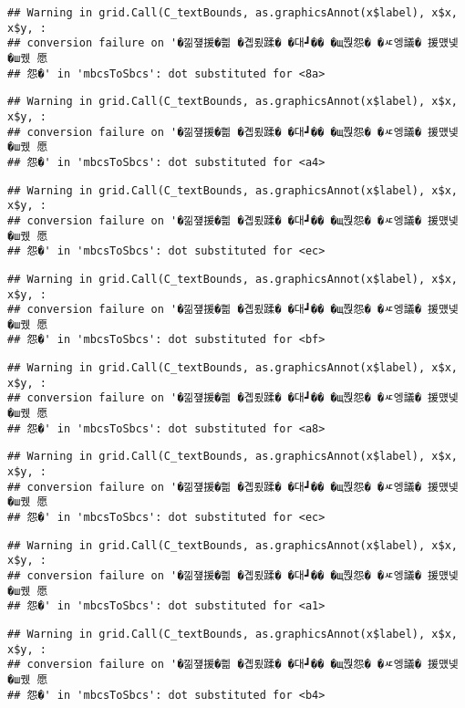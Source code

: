 \documentclass[
]{article}
\begin{document}
\begin{verbatim}
## Warning in grid.Call(C_textBounds, as.graphicsAnnot(x$label), x$x, x$y, :
## conversion failure on '�낆쟾援�쁾 �곕룄蹂� �대┛�� �щ쭩怨� �ㅼ엥議� 援먰넻�ш퀬 愿
## 怨�' in 'mbcsToSbcs': dot substituted for <8a>
\end{verbatim}

\begin{verbatim}
## Warning in grid.Call(C_textBounds, as.graphicsAnnot(x$label), x$x, x$y, :
## conversion failure on '�낆쟾援�쁾 �곕룄蹂� �대┛�� �щ쭩怨� �ㅼ엥議� 援먰넻�ш퀬 愿
## 怨�' in 'mbcsToSbcs': dot substituted for <a4>
\end{verbatim}

\begin{verbatim}
## Warning in grid.Call(C_textBounds, as.graphicsAnnot(x$label), x$x, x$y, :
## conversion failure on '�낆쟾援�쁾 �곕룄蹂� �대┛�� �щ쭩怨� �ㅼ엥議� 援먰넻�ш퀬 愿
## 怨�' in 'mbcsToSbcs': dot substituted for <ec>
\end{verbatim}

\begin{verbatim}
## Warning in grid.Call(C_textBounds, as.graphicsAnnot(x$label), x$x, x$y, :
## conversion failure on '�낆쟾援�쁾 �곕룄蹂� �대┛�� �щ쭩怨� �ㅼ엥議� 援먰넻�ш퀬 愿
## 怨�' in 'mbcsToSbcs': dot substituted for <bf>
\end{verbatim}

\begin{verbatim}
## Warning in grid.Call(C_textBounds, as.graphicsAnnot(x$label), x$x, x$y, :
## conversion failure on '�낆쟾援�쁾 �곕룄蹂� �대┛�� �щ쭩怨� �ㅼ엥議� 援먰넻�ш퀬 愿
## 怨�' in 'mbcsToSbcs': dot substituted for <a8>
\end{verbatim}

\begin{verbatim}
## Warning in grid.Call(C_textBounds, as.graphicsAnnot(x$label), x$x, x$y, :
## conversion failure on '�낆쟾援�쁾 �곕룄蹂� �대┛�� �щ쭩怨� �ㅼ엥議� 援먰넻�ш퀬 愿
## 怨�' in 'mbcsToSbcs': dot substituted for <ec>
\end{verbatim}

\begin{verbatim}
## Warning in grid.Call(C_textBounds, as.graphicsAnnot(x$label), x$x, x$y, :
## conversion failure on '�낆쟾援�쁾 �곕룄蹂� �대┛�� �щ쭩怨� �ㅼ엥議� 援먰넻�ш퀬 愿
## 怨�' in 'mbcsToSbcs': dot substituted for <a1>
\end{verbatim}

\begin{verbatim}
## Warning in grid.Call(C_textBounds, as.graphicsAnnot(x$label), x$x, x$y, :
## conversion failure on '�낆쟾援�쁾 �곕룄蹂� �대┛�� �щ쭩怨� �ㅼ엥議� 援먰넻�ш퀬 愿
## 怨�' in 'mbcsToSbcs': dot substituted for <b4>
\end{verbatim}
\end{document}
